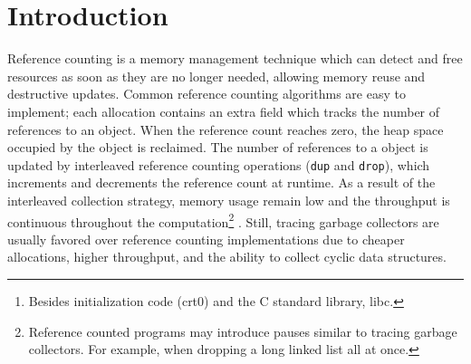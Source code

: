 \documentclass[9pt, twocolumn]{article}
\begin{document}
\begin{abstract}
Precise reference counting is a technique by \citeauthor{reinking2021} that uses ownership to deallocate objects as soon as possible. 
The algorithm is called Perceus, and as of this writing, it has only been impl\-emented for eager functional languages.
This paper describes the implementation of a new lazy compiler backend for the Agda programming lang\-uage with precise reference counting.
The compiler uses \citeauthor{johnsson1991} and \citeauthor{boquist1999}'s intermediate language GRIN to compile lazy programs. 
GRIN uses an inter\-procedural \mbox{points-to} analysis to inline the evaluation of suspended computations.
We extend GRIN with a variant of Perceus, and demonstrate the applic\-ability of combining lazy functional programming with precise reference counting by developing a GRIN interpreter and an LLVM IR code generator. 
  Due to GRIN and reference counting, our compiler does not require an external runtime system%
\footnote{Besides initialization code (crt0) and the C standard library, libc.}%
 , which is uncommon for lazy functional languages.%

\end{abstract}

\section{Introduction}

Reference counting \citep{collins1960} is a memory management technique which can detect and free resources as soon as they are no longer needed, allowing memory reuse and destructive updates. 
Common reference counting algorithms are easy to implement; each allocation contains an extra field which tracks the number of references to an object. 
When the reference count reaches zero, the heap space occupied by the object is reclaimed.
The number of references to a object is updated by interleaved reference counting operations (\texttt{dup} and \texttt{drop}), which increments and decrements the reference count at runtime. 
As a result of the interleaved collection strategy, memory usage remain low and the throughput is continuous throughout the computation\footnote{Reference counted programs may introduce pauses similar to tracing garbage collectors. For example, when dropping a long linked list all at once.} \citep{jones1996}.
Still, tracing garbage collectors are usually favored over reference counting implementations due to cheaper allocations, higher throughput, and the ability to collect cyclic data structures.
\end{document}
